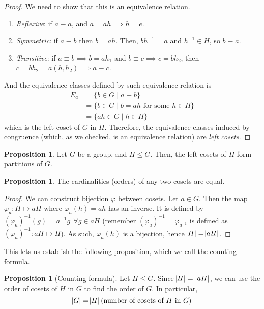 \documentclass[11pt]{amsart} %
\theoremstyle{definition}
\newtheorem{proposition}[definition]{Proposition}
\theoremstyle{definition}
\numberwithin{equation}{section}
\begin{document}
\begin{proof}
	We need to show that this is an equivalence relation.
	\begin{enumerate}%
		\item \textit{Reflexive}: if $a \equiv a$, and $a = ah \implies h = e$.
		\item \textit{Symmetric}: if $a \equiv b$ then $b=ah$. Then, $bh^{-1} = a$ and $h^{-1} \in H$, so $b \equiv a$.
		\item \textit{Transitive}: if $a \equiv b \implies b = a h_1$ and $b \equiv c \implies c = b h_2$, then $c = b h_2 = a(h_1 h_2) \implies a \equiv c$.
	\end{enumerate}
	And the equivalence classes defined by such equivalence relation is
	$$\begin{aligned}
	E_a &= \{ b \in G \mid a \equiv b \} \\
	&= \{ b \in G \mid b = ah \text{ for some } h \in H \} \\
	&= \{ ah \in G \mid h \in H  \}
	\end{aligned}$$
	which is the left coset of $G$ in $H$. Therefore, the equivalence classes induced by congruence (which, as we checked, is an equivalence relation) are \textit{left cosets}.
\end{proof}

\begin{proposition}
	Let $G$ be a group, and $H \leq G$. Then, the left cosets of $H$ form partitions of $G$.
\end{proposition}

\begin{proposition}
	The cardinalities (orders) of any two cosets are equal.
\end{proposition}

\begin{proof}
	We can construct bijection $\varphi$ between cosets. Let $a \in G$. Then the map $\varphi_a : H \mapsto aH$ where $\varphi_a (h) = ah$ has an inverse. It is defined by $(\varphi_a)^{-1} (g) = a^{-1} g \: \: \forall g \in aH$ (remember $(\varphi_a)^{-1} =  \varphi_{a^{-1}}$ is defined as $(\varphi_a)^{-1} : aH \mapsto H$). As such, $\varphi_a (h)$ is a bijection, hence $\abs{H} = \abs{aH}$.
\end{proof}

This lets us establish the following proposition, which we call the counting formula.

\begin{proposition}[Counting formula]
	Let $H \leq G$. Since $\abs{H} = |aH|$, we can use the order of cosets of $H$ in $G$ to find the order of $G$. In particular,
	$$ \abs{G} = \abs{H} (\text{number of cosets of $H$ in $G$}) $$
\end{proposition}
\end{document}
